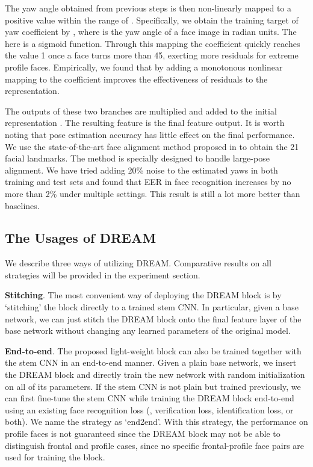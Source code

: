 \documentclass[10pt,twocolumn,letterpaper]{article}
\begin{document}
The yaw angle obtained from previous steps is then non-linearly mapped to a positive value within the range of .
Specifically, we obtain the training target of yaw coefficient by , where  is the yaw angle of a face image in radian units. The  here is a sigmoid function. Through this mapping the coefficient quickly reaches the value 1 once a face turns more than 45, exerting more residuals for extreme profile faces. 
Empirically, we found that by adding a monotonous nonlinear mapping to the coefficient improves the effectiveness of residuals to the representation. 


The outputs of these two branches are multiplied and added to the initial representation . The resulting feature  is the final feature output.
It is worth noting that pose estimation accuracy has little effect on the final performance. We use the state-of-the-art face alignment method proposed in \cite{zhu2016unconstrained} to obtain the 21 facial landmarks. The method is specially designed to handle large-pose alignment. We have tried adding 20\% noise to the estimated yaws in both training and test sets and found that EER in face recognition increases by no more than 2\% under multiple settings. This result is still a lot more better than baselines.


\subsection{The Usages of DREAM}
\label{subsec:strategy}


We describe three ways of utilizing DREAM. Comparative results on all strategies will be provided in the experiment section.

\noindent
\textbf{Stitching}.
The most convenient way of deploying the DREAM block is by `stitching' the block directly to a trained stem CNN. In particular, given a base network, we can just stitch the DREAM block onto the final feature layer of the base network without changing any learned parameters of the original model.





\noindent
\textbf{End-to-end}.
The proposed light-weight block can also be trained together with the stem CNN in an end-to-end manner. Given a plain base network, we insert the DREAM block and directly train the new network with random initialization on all of its parameters. 
If the stem CNN is not plain but trained previously, we can first fine-tune the stem CNN while training the DREAM block end-to-end using an existing face recognition loss (\eg, verification loss, identification loss, or both). We name the strategy as `end2end'. With this strategy, the performance on profile faces is not guaranteed since the DREAM block may not be able to distinguish frontal and profile cases, since no specific frontal-profile face pairs are used for training the block.
\end{document}
